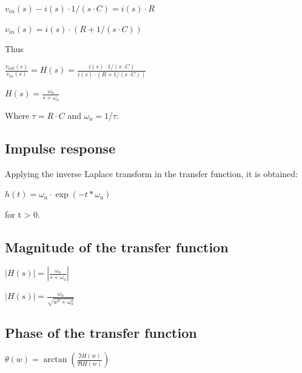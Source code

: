 \documentclass{article}
\begin{document}
\centerline{$ v_{in}(s) - i(s) \cdot 1/(s \cdot C) = i(s) \cdot R
	$}
\vspace{\baselineskip}

\centerline{$ v_{in}(s) = i(s) \cdot (R + 1/(s \cdot C))
	$}
\vspace{\baselineskip}

Thus

\centerline{$ \frac{v_{out}(s)}{v_{in}(s)} = H(s) = \frac{i(s) \cdot 1/(s \cdot C)}{i(s) \cdot (R + 1/(s \cdot C))}
	$}
\vspace{\baselineskip}

\begin{question}
\centerline{$ H(s) = \frac{\omega_{a}}{s + \omega_{a}}
	$}
\end{question}

Where $\tau = R \cdot C $ and $\omega_{a} = 1/ \tau$.

\subsection{Impulse response}

Applying the inverse Laplace transform in the transfer function, it is obtained:

\begin{question}
\centerline{$ h(t) = \omega_{a} \cdot \exp(-t * \omega_{a})
	$}
\end{question}

for t > 0.

\subsection{Magnitude of the transfer function}

\centerline{$ |H(s)| = |\frac{\omega_{a}}{s + \omega_{a}}|
	$}
\vspace{\baselineskip}

\begin{question}
\centerline{$ |H(s)| = \frac{\omega_{a}}{\sqrt{w^2 + \omega_{a}^2}}
	$}
\end{question}

\subsection{Phase of the transfer function}

\centerline{$ \theta(w) = \arctan{(\frac{\Im{H(w)}}{\Re{H(w)}})}
	$}
\vspace{\baselineskip}
\end{document}
